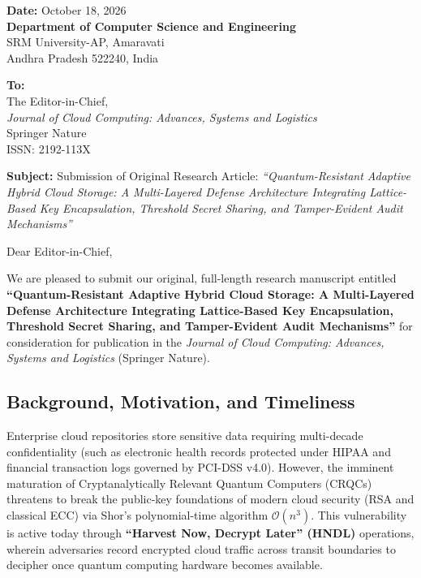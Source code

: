 \documentclass[11pt,a4paper]{article}
\begin{document}
\begin{flushright}
\textbf{Date:} October 18, 2026 \\[4pt]
\textbf{Department of Computer Science and Engineering} \\
SRM University-AP, Amaravati \\
Andhra Pradesh 522240, India
\end{flushright}

\vspace{10pt}

\textbf{To:} \\
The Editor-in-Chief, \\
\textit{Journal of Cloud Computing: Advances, Systems and Logistics} \\
Springer Nature \\
ISSN: 2192-113X

\vspace{12pt}

\textbf{Subject:} Submission of Original Research Article: \textit{``Quantum-Resistant Adaptive Hybrid Cloud Storage: A Multi-Layered Defense Architecture Integrating Lattice-Based Key Encapsulation, Threshold Secret Sharing, and Tamper-Evident Audit Mechanisms''}

\vspace{10pt}

Dear Editor-in-Chief,

We are pleased to submit our original, full-length research manuscript entitled \textbf{``Quantum-Resistant Adaptive Hybrid Cloud Storage: A Multi-Layered Defense Architecture Integrating Lattice-Based Key Encapsulation, Threshold Secret Sharing, and Tamper-Evident Audit Mechanisms''} for consideration for publication in the \textit{Journal of Cloud Computing: Advances, Systems and Logistics} (Springer Nature).

\subsection*{Background, Motivation, and Timeliness}
Enterprise cloud repositories store sensitive data requiring multi-decade confidentiality (such as electronic health records protected under HIPAA and financial transaction logs governed by PCI-DSS v4.0). However, the imminent maturation of Cryptanalytically Relevant Quantum Computers (CRQCs) threatens to break the public-key foundations of modern cloud security (RSA and classical ECC) via Shor's polynomial-time algorithm $\mathcal{O}(n^3)$. This vulnerability is active today through \textbf{``Harvest Now, Decrypt Later'' (HNDL)} operations, wherein adversaries record encrypted cloud traffic across transit boundaries to decipher once quantum computing hardware becomes available.
\end{document}
